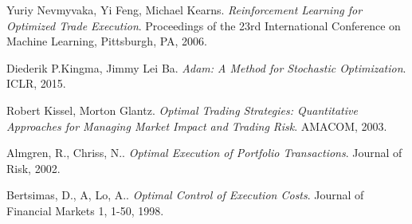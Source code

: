 \documentclass[12pt]{extarticle}
\begin{document}
\begin{thebibliography}{9}
Yuriy Nevmyvaka, Yi Feng, Michael Kearns.
\textit{Reinforcement Learning for Optimized Trade Execution}.
Proceedings of the 23rd International Conference on Machine Learning, Pittsburgh, PA, 2006.

Diederik P.Kingma, Jimmy Lei Ba.
\textit{Adam: A Method for Stochastic Optimization}.
ICLR, 2015.

Robert Kissel, Morton Glantz.
\textit{Optimal Trading Strategies: Quantitative Approaches for Managing Market Impact and Trading Risk}.
AMACOM, 2003.

Almgren, R., Chriss, N..
\textit{Optimal Execution of Portfolio Transactions}.
Journal of Risk, 2002.

Bertsimas, D., A, Lo, A..
\textit{Optimal Control of Execution Costs}.
Journal of Financial Markets 1, 1-50, 1998.
\end{thebibliography}
\end{document}
